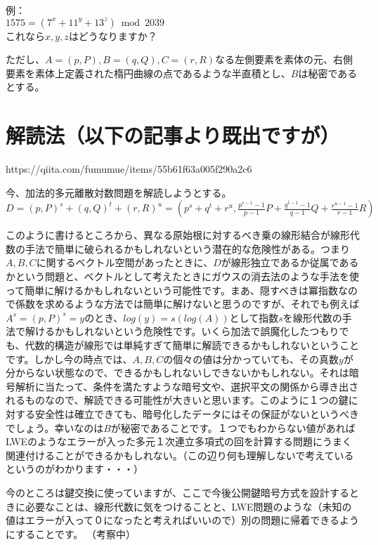 \documentclass[
]{article}
\begin{document}
例：\\
\(1575=(7^x+11^y+13^z) \bmod 2039\)\\
これなら\(x,y,z\)はどうなりますか？

ただし、\(A=(p,P),B=(q,Q),C=(r,R)\)なる左側要素を素体の元、右側要素を素体上定義された楕円曲線の点であるような半直積とし、\(B\)は秘密であるとする。

\hypertarget{ux89e3ux8aadux6cd5ux4ee5ux4e0bux306eux8a18ux4e8bux3088ux308aux65e2ux51faux3067ux3059ux304c}{%
\section{解読法（以下の記事より既出ですが）}\label{ux89e3ux8aadux6cd5ux4ee5ux4e0bux306eux8a18ux4e8bux3088ux308aux65e2ux51faux3067ux3059ux304c}}

https://qiita.com/fumumue/items/55b61f63a005f290a2c6

今、加法的多元離散対数問題を解読しようとする。\\
\(D=(p,P)^s+(q,Q)^t+(r,R)^u=(p^s+q^t+r^u,\frac{p^{s-1}-1}{p-1}P+\frac{q^{t-1}-1}{q-1}Q+\frac{r^{u-1}-1}{r-1}R)\)

このように書けるところから、異なる原始根に対するべき乗の線形結合が線形代数の手法で簡単に破られるかもしれないという潜在的な危険性がある。つまり\(A,B,C\)に関するベクトル空間があったときに、\(D\)が線形独立であるか従属であるかという問題と、ベクトルとして考えたときにガウスの消去法のような手法を使って簡単に解けるかもしれないという可能性です。まあ、隠すべきは冪指数なので係数を求めるような方法では簡単に解けないと思うのですが、それでも例えば\(A^s=(p,P)^s=y\)のとき、\(log(y)=s(log(A))\)として指数\(s\)を線形代数の手法で解けるかもしれないという危険性です。いくら加法で誤魔化したつもりでも、代数的構造が線形では単純すぎて簡単に解読できるかもしれないということです。しかし今の時点では、\(A,B,C\)の個々の値は分かっていても、その真数\(y\)が分からない状態なので、できるかもしれないしできないかもしれない。それは暗号解析に当たって、条件を満たすような暗号文や、選択平文の関係から導き出されるものなので、解読できる可能性が大きいと思います。このように１つの鍵に対する安全性は確立できても、暗号化したデータにはその保証がないというべきでしょう。幸いなのは\(B\)が秘密であることです。１つでもわからない値があればLWEのようなエラーが入った多元１次連立多項式の回を計算する問題にうまく関連付けることができるかもしれない。（この辺り何も理解しないで考えているというのがわかります・・・）

今のところは鍵交換に使っていますが、ここで今後公開鍵暗号方式を設計するときに必要なことは、線形代数に気をつけることと、LWE問題のような（未知の値はエラーが入って０になったと考えればいいので）別の問題に帰着できるようにすることです。
（考察中）
\end{document}
